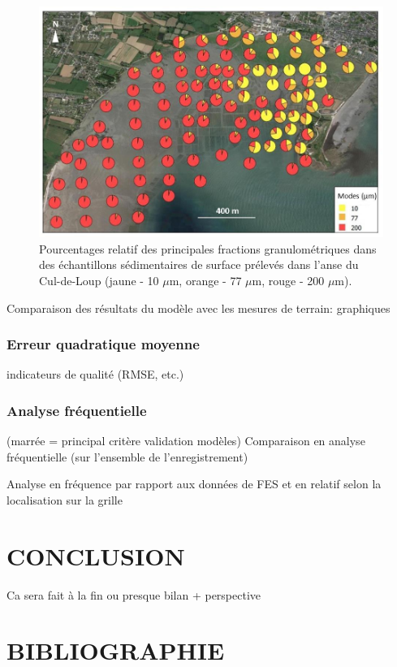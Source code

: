 \documentclass[10pt,a4paper,titlepage]{article}
\begin{document}
\begin{figure}[!h]
    \centering
    \includegraphics[width=0.8\linewidth]{../images/sed_adcl_protec.png}
    \caption[Sédiment de l'anse du Cul-de-Loup]{Pourcentages relatif des principales fractions granulométriques dans des échantillons sédimentaires de surface prélevés dans l'anse du Cul-de-Loup (jaune - 10 $\mu$m, orange - 77 $\mu$m, rouge - 200 $\mu$m).}
    \label{fig:sed-adcl}
\end{figure}



Comparaison des résultats du modèle avec les mesures de terrain: graphiques

\subsubsection{Erreur quadratique moyenne}
indicateurs de qualité (RMSE, etc.)

\subsubsection{Analyse fréquentielle}
(marrée = principal critère validation modèles)
Comparaison en analyse fréquentielle (sur l'ensemble de l'enregistrement)

Analyse en fréquence par rapport aux données de FES et en relatif selon la localisation sur la grille

\newpage

\section{CONCLUSION}
\label{sec:conclusion}

Ca sera fait à la fin ou presque
bilan + perspective

\newpage
\section{BIBLIOGRAPHIE}
%
%
\printbibliography
\end{document}
